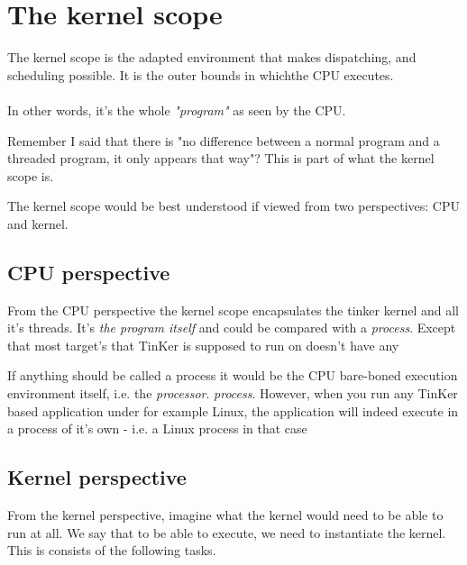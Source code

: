 \chapter{The kernel scope}
The kernel scope is the adapted environment that makes dispatching, and scheduling possible. It is the outer bounds in whichthe CPU executes.
\\\\
In other words, it's the whole \textit{"program"} as seen by the CPU. 

Remember I said that there is "no difference between a normal program and a threaded program, it only appears that way"? This is part of what the kernel scope is.

The kernel scope would be best understood if viewed from two perspectives: CPU and kernel.

\section{CPU perspective}
	From the CPU perspective the kernel scope encapsulates the tinker kernel and all it's threads. It's \textit{the program itself} and could be compared with a \textit{process}. Except that most target's that TinKer is supposed to run on doesn't have any 

	If anything should be called a process it would be the CPU bare-boned execution environment itself, i.e. the \textit{processor}. 
	\textit{process}.%
	However, when you run any TinKer based application under for example Linux, the application will indeed execute in a process of it's own - i.e. a Linux process in that case 

\section{Kernel perspective}
	From the kernel perspective, imagine what the kernel would need to be able to run at all. We say that to be able to execute, we need to instantiate the kernel. This is consists of the following tasks.

